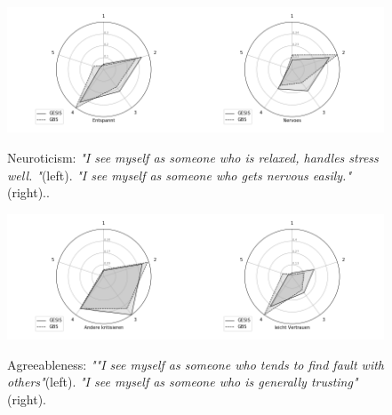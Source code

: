                 \begin{figure}[ht]
                \begin{center}
                   \includegraphics[scale=0.55,angle=0]{fig/Neuroticismfigure}
	         \label{Neuroticism}
	         \caption{Neuroticism: \textit{"I see myself as someone who is relaxed, handles stress well. "}(left). \textit{"I see myself as someone who gets nervous easily."}(right)..}
                \end{center}
                \end{figure}

\begin{figure}[H]
\begin{center}
\includegraphics[scale=0.75,angle=0]{fig/Agreeablenessfigure}
\label{Agreeableness}
\caption{Agreeableness: \textit{""I see myself as someone who tends to find fault with others"}(left). \textit{"I see myself as someone who is generally trusting"}(right).}
\end{center}
\end{figure}